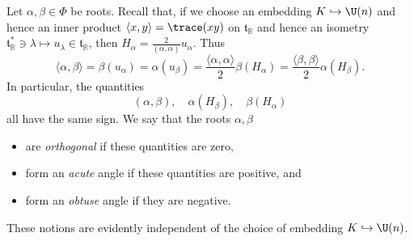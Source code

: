 \documentclass[reqno]{amsart} 
\begin{document}
Let $\alpha,\beta \in \Phi$ be roots.  Recall that, if we choose an embedding $K \hookrightarrow \U(n)$ and hence an inner product $\langle x,y \rangle = \trace( x y)$ on $\mathfrak{t}_{\mathbb{R}}$ and hence an isometry $\mathfrak{t}_{\mathbb{R}}^* \ni \lambda \mapsto u_\lambda \in \mathfrak{t}_{\mathbb{R}}$, then $H_\alpha = \frac{2}{( \alpha, \alpha )} u_\alpha$.  Thus
\begin{equation}\label{eq:identity-alpha-beta-inner-prod-vs-H-stuff}
  \langle \alpha, \beta  \rangle
  =
  \beta(u_\alpha)
  =
  \alpha(u_\beta)
  =
  \frac{\langle\alpha,\alpha\rangle}{2}
  \beta(H_\alpha)
  = 
  \frac{\langle\beta,\beta\rangle}{2}
  \alpha(H_\beta).
\end{equation}
In particular, the quantities
\begin{equation*}
  (\alpha,\beta),
  \quad
  \alpha(H_\beta),
  \quad 
  \beta(H_\alpha)
\end{equation*}
all have the same sign.  We say that the roots $\alpha,\beta$
\begin{itemize}
\item are \emph{orthogonal} if these quantities are zero,
\item form an \emph{acute} angle if these quantities are positive, and
\item form an \emph{obtuse} angle if they are negative.
\end{itemize}
These notions are evidently independent of the choice of embedding $K \hookrightarrow \U(n)$.
\end{document}
